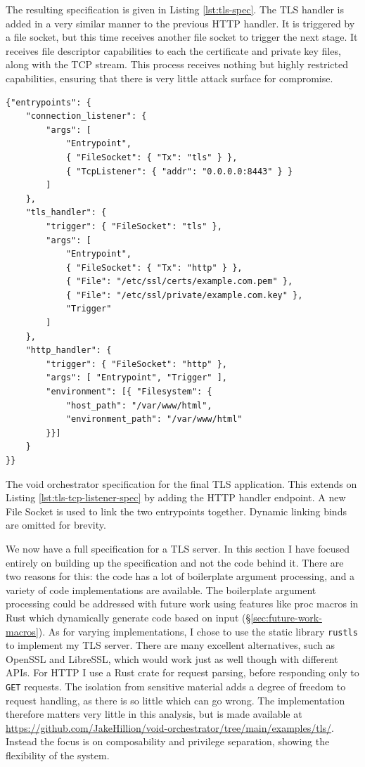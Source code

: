 \documentclass[12pt,a4paper,twoside]{report}
\newif\ifsubmission %
\begin{document}
The resulting specification is given in Listing \ref{lst:tls-spec}. The TLS handler is added in a very similar manner to the previous HTTP handler. It is triggered by a file socket, but this time receives another file socket to trigger the next stage. It receives file descriptor capabilities to each the certificate and private key files, along with the TCP stream. This process receives nothing but highly restricted capabilities, ensuring that there is very little attack surface for compromise.

\begin{listing}
\begin{verbatim}
{"entrypoints": {
    "connection_listener": {
        "args": [
            "Entrypoint",
            { "FileSocket": { "Tx": "tls" } },
            { "TcpListener": { "addr": "0.0.0.0:8443" } }
        ]
    },
    "tls_handler": {
        "trigger": { "FileSocket": "tls" },
        "args": [
            "Entrypoint",
            { "FileSocket": { "Tx": "http" } },
            { "File": "/etc/ssl/certs/example.com.pem" },
            { "File": "/etc/ssl/private/example.com.key" },
            "Trigger"
        ]
    },
    "http_handler": {
        "trigger": { "FileSocket": "http" },
        "args": [ "Entrypoint", "Trigger" ],
        "environment": [{ "Filesystem": {
            "host_path": "/var/www/html",
            "environment_path": "/var/www/html"
        }}]
    }
}}
\end{verbatim}

\caption{The void orchestrator specification for the final TLS application. This extends on Listing \ref{lst:tls-tcp-listener-spec} by adding the HTTP handler endpoint. A new File Socket is used to link the two entrypoints together. Dynamic linking binds are omitted for brevity.}
\label{lst:tls-spec}
\end{listing}

We now have a full specification for a TLS server. In this section I have focused entirely on building up the specification and not the code behind it. There are two reasons for this: the code has a lot of boilerplate argument processing, and a variety of code implementations are available. The boilerplate argument processing could be addressed with future work using features like proc macros in Rust which dynamically generate code based on input (§\ref{sec:future-work-macros}). As for varying implementations, I chose to use the static library \texttt{rustls} to implement my TLS server. There are many excellent alternatives, such as OpenSSL and LibreSSL, which would work just as well though with different APIs. For HTTP I use a Rust crate for request parsing, before responding only to \texttt{GET} requests. The isolation from sensitive material adds a degree of freedom to request handling, as there is so little which can go wrong. The implementation therefore matters very little in this analysis, but is made available at \ifsubmission\url{file:///SUBMITTED_SRC/void-orchestrator/examples/tls/}\else\url{https://github.com/JakeHillion/void-orchestrator/tree/main/examples/tls/}\fi. Instead the focus is on composability and privilege separation, showing the flexibility of the system.
\end{document}
